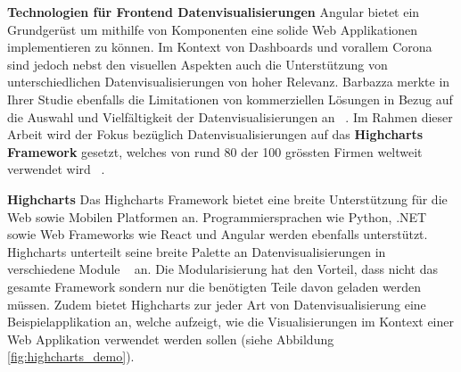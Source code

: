 \begin{table}[h]
\centering
{}
\caption{Gebräuchliche Angular CLI Befehle ~\citep{angular_cli}}
\label{table:tbl:angular_cli_commands}
\end{table}


\textbf{Technologien für Frontend Datenvisualisierungen}
\newline
Angular bietet ein Grundgerüst um mithilfe von Komponenten eine solide Web Applikationen implementieren zu können. Im Kontext von Dashboards und vorallem Corona sind jedoch nebst den visuellen Aspekten auch die Unterstützung von unterschiedlichen Datenvisualisierungen von hoher Relevanz. Barbazza merkte in Ihrer Studie ebenfalls die Limitationen von kommerziellen Lösungen in Bezug auf die Auswahl und Vielfältigkeit der Datenvisualisierungen an ~\citep[S. 9]{barbazza}. Im Rahmen dieser Arbeit wird der Fokus bezüglich Datenvisualisierungen auf das \textbf{Highcharts Framework} gesetzt, welches von rund 80 der 100 grössten Firmen weltweit verwendet wird ~\citep{highcharts}.
\newline

\newpage
\textbf{Highcharts}
\newline
Das Highcharts Framework bietet eine breite Unterstützung für die Web sowie Mobilen Platformen an. Programmiersprachen wie Python, .NET sowie Web Frameworks wie React und Angular werden ebenfalls unterstützt. Highcharts unterteilt seine breite Palette an Datenvisualisierungen in verschiedene Module ~\citep{highcharts} an. Die Modularisierung hat den Vorteil, dass nicht das gesamte Framework sondern nur die benötigten Teile davon geladen werden müssen. Zudem bietet Highcharts zur jeder Art von Datenvisualisierung eine Beispielapplikation an, welche aufzeigt, wie die Visualisierungen im Kontext einer Web Applikation verwendet werden sollen (siehe Abbildung \ref{fig:highcharts_demo}).

